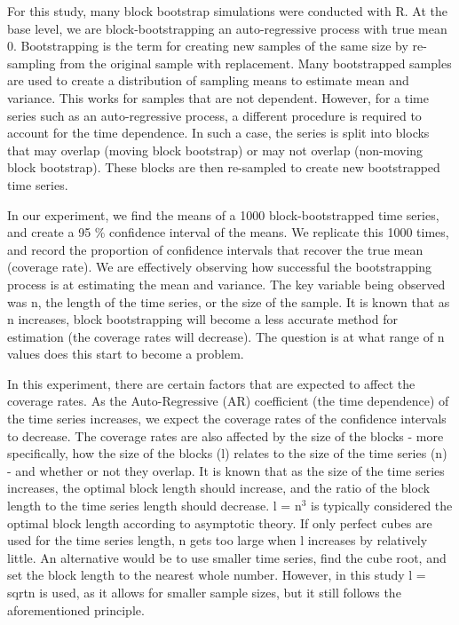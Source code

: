 \documentclass[12pt, letterpaper, titlepage]{article}
\begin{document}
For this study, many block bootstrap simulations were conducted with R. At the base
level, we are block-bootstrapping an auto-regressive process with true mean 0.
Bootstrapping is the term for creating new samples of the same size by re-sampling from
the original sample with replacement. Many bootstrapped samples are used to create a
distribution of sampling means to estimate mean and variance. This works for samples
that are not dependent. However, for a time series such as an auto-regressive process,
a different procedure is required to account for the time dependence. In such a case,
the series is split into blocks that may overlap (moving block bootstrap) or may not
overlap (non-moving block bootstrap). These blocks are then re-sampled to create new
bootstrapped time series. 

In our experiment, we find the means of a 1000 block-bootstrapped time series, 
and create a 95 \% confidence interval of the means. We replicate this 1000 times, 
and record the proportion of confidence intervals that recover the true mean 
(coverage rate). We are effectively observing how successful the bootstrapping process
is at estimating the mean and variance. The key variable being observed was n, 
the length of the time series, or the size of the sample. It is known that as n
increases, block bootstrapping will become a less accurate method for estimation
(the coverage rates will decrease). The question is at what range of n values does this
start to become a problem. 

In this experiment, there are certain factors that are expected to affect the coverage
rates. As the Auto-Regressive (AR) coefficient (the time dependence) of the time series 
increases,
we expect the coverage rates of the confidence intervals to decrease.
The coverage rates are also affected by the size of the blocks - more specifically,
how the size of the blocks (l) relates to the size of the time series (n) - 
and whether or not they overlap. It is known that as the size of the time series 
increases, the optimal block length should increase, and the ratio of the block length to 
the time series length should decrease. l = n$^3$ is typically considered the optimal 
block length according to asymptotic theory. \citep{buhlmann1999block} If only perfect cubes are used for the time 
series length, n gets too large when l increases by relatively little. An alternative 
would be to use smaller time series, find the cube root, and set the block length to the 
nearest whole number. However, in this study l = sqrt{n} is used, as it allows for smaller 
sample sizes, but it still follows the aforementioned principle.
\end{document}
